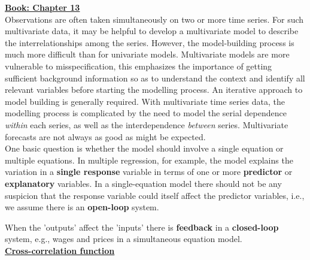 \bigskip
\textbf{\underline{Book: Chapter 13}}\\

Observations are often taken simultaneously on two or more time series. For such multivariate data, it may be helpful to develop a multivariate model to describe the interrelationships among the series. However, the model-building process is much more difficult than for univariate models. Multivariate models are more vulnerable to misspecification, this emphasizes the importance of getting sufficient background information so as to understand the context and identify all relevant variables before starting the modelling process. An iterative approach to model building is generally required. With multivariate time series data, the modelling process is complicated by the need to model the serial dependence \textit{within} each series, as well as the interdependence \textit{between} series. Multivariate forecasts are not always as good as might be expected.\\

One basic question is whether the model should involve a single equation or multiple equations. In multiple regression, for example, the model explains the variation in a \textbf{single response} variable in terms of one or more \textbf{predictor} or \textbf{explanatory} variables. In a single-equation model there should not be any suspicion that the response variable could itself affect the predictor variables, i.e., we assume there is an \textbf{open-loop} system. \

When the 'outputs' affect the 'inputs' there is \textbf{feedback} in a \textbf{closed-loop} system, e.g., wages and prices in a simultaneous equation model. \\

\bigskip
\noindent
\textbf{\underline{Cross-correlation function}}\\

